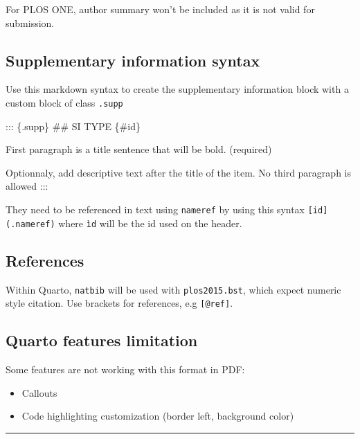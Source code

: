 \documentclass[
  10pt,
  letterpaper,
]{article}
\newenvironment{Shaded}{\begin{snugshade}}{\end{snugshade}}
\newcommand{\FunctionTok}[1]{\textcolor[rgb]{0.28,0.35,0.67}{#1}}
\newcommand{\NormalTok}[1]{\textcolor[rgb]{0.00,0.23,0.31}{#1}}
\providecommand{\tightlist}{%
  \setlength{\itemsep}{0pt}\setlength{\parskip}{0pt}}
\begin{document}
For PLOS ONE, author summary won't be included as it is not valid for
submission.

\subsection{Supplementary information
syntax}\label{supplementary-information-syntax}

Use this markdown syntax to create the supplementary information block
with a custom block of class \texttt{.supp}

\begin{Shaded}
\begin{Highlighting}[]
\NormalTok{::: \{.supp\}}
\FunctionTok{\#\# SI TYPE \{\#id\}}

\NormalTok{First paragraph is a title sentence that will be bold. (required)}

\NormalTok{Optionnaly, add descriptive text after the title of the}
\NormalTok{item. No third paragraph is allowed}
\NormalTok{:::}
\end{Highlighting}
\end{Shaded}

They need to be referenced in text using \texttt{nameref} by using this
syntax \texttt{{[}id{]}(.nameref)} where \texttt{ìd} will be the id used
on the header.

\subsection{References}\label{references}

Within Quarto, \texttt{natbib} will be used with \texttt{plos2015.bst},
which expect numeric style citation. Use brackets for references, e.g
\texttt{{[}@ref{]}}.

\subsection{Quarto features
limitation}\label{quarto-features-limitation}

Some features are not working with this format in PDF:

\begin{itemize}
\tightlist
\item
  Callouts
\item
  Code highlighting customization (border left, background color)
\end{itemize}

\begin{center}\rule{0.5\linewidth}{0.5pt}\end{center}
\end{document}
